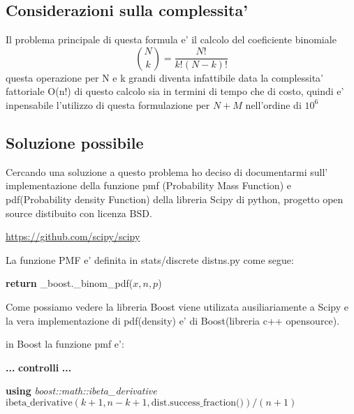\documentclass{article}
\begin{document}
\subsection{Considerazioni sulla complessita'}

Il problema principale di questa formula e' il calcolo del coeficiente binomiale 
\[
\binom{N}{k} = \frac{N!}{k!(N-k)!}
\]
questa operazione per N e k grandi diventa infattibile data la complessita' fattoriale O(n!) di questo calcolo sia in termini di tempo che di costo, quindi e' inpensabile l'utilizzo di questa formulazione per $N+M$ nell'ordine di $10^6$

\subsection{Soluzione possibile}

Cercando una soluzione a questo problema ho deciso di documentarmi sull' implementazione della funzione pmf (Probability Mass Function) e pdf(Probability density Function) della libreria Scipy di python, progetto open source distibuito con licenza BSD.

\href{https://github.com/scipy/scipy}{https://github.com/scipy/scipy}

La funzione PMF e' definita in stats/discrete distns.py come segue:

\begin{algorithm}
\caption{}
\begin{algorithmic}[1]
    \State \textbf{return} \_boost.\_binom\_pdf($x, n, p$)
\EndFunction
\end{algorithmic}
\end{algorithm}

Come possiamo vedere la libreria Boost viene utilizata ausiliariamente a Scipy e la vera implementazione di pdf(density) e' di Boost(libreria c++ opensource).

\newpage

in Boost la funzione pmf e':

\begin{algorithm}
\caption{}
\begin{algorithmic}[2]
    \State \textbf{...} 
    \State \textbf{controlli} 
    \State \textbf{...} 

    \State \textbf{using} \textit{boost::math::ibeta\_derivative}
    \State \Return $\text{ibeta\_derivative}(k+1, n-k+1, \text{dist.success\_fraction()}) / (n+1)$
\EndFunction
\end{algorithmic}
\end{algorithm}
\end{document}
